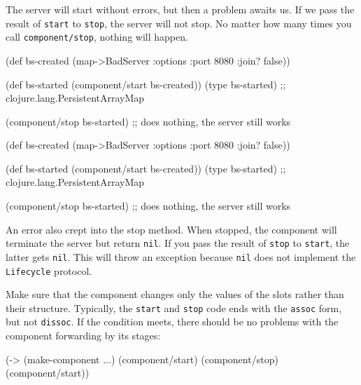 The server will start without errors, but then a problem awaits us. If we pass the result of \verb|start| to \verb|stop|, the server will not stop. No matter how many times you call \verb|component/stop|, nothing will happen.

\ifnarrow

\begin{english}
  \begin{clojure}
(def bs-created
  (map->BadServer
    {:options {:port 8080
               :join? false}}))

(def bs-started
   (component/start bs-created))
(type bs-started)
;; clojure.lang.PersistentArrayMap

(component/stop bs-started)
;; does nothing, the server still works
  \end{clojure}
\end{english}

\else

\begin{english}
  \begin{clojure}
(def bs-created (map->BadServer
                  {:options {:port 8080 :join? false}}))

(def bs-started (component/start bs-created))
(type bs-started)
;; clojure.lang.PersistentArrayMap

(component/stop bs-started)
;; does nothing, the server still works
  \end{clojure}
\end{english}

\fi

An error also crept into the stop method. When stopped, the component will terminate the server but return \verb|nil|. If you pass the result of \verb|stop| to \verb|start|, the latter gets \verb|nil|. This will throw an exception because \verb|nil| does not implement the \verb|Lifecycle| protocol.


Make sure that the component changes only the values of the slots rather than their structure. Typically, the \verb|start| and \verb|stop| code ends with the \verb|assoc| form, but not \verb|dissoc|. If the condition meets, there should be no problems with the component forwarding by its stages:

\begin{english}
  \begin{clojure}
(-> (make-component {...})
    (component/start)
    (component/stop)
    (component/start))
  \end{clojure}
\end{english}

